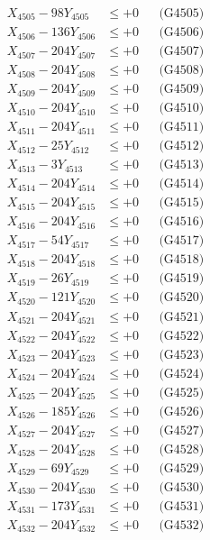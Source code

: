 \documentclass[a4paper,10pt]{article}
\begin{document}
{\begin{align}
X_{4505} - 98Y_{4505} &\leq +0 && \text{(G4505)} \\
X_{4506} - 136Y_{4506} &\leq +0 && \text{(G4506)} \\
X_{4507} - 204Y_{4507} &\leq +0 && \text{(G4507)} \\
X_{4508} - 204Y_{4508} &\leq +0 && \text{(G4508)} \\
X_{4509} - 204Y_{4509} &\leq +0 && \text{(G4509)} \\
X_{4510} - 204Y_{4510} &\leq +0 && \text{(G4510)} \\
\allowbreak
X_{4511} - 204Y_{4511} &\leq +0 && \text{(G4511)} \\
X_{4512} - 25Y_{4512} &\leq +0 && \text{(G4512)} \\
X_{4513} - 3Y_{4513} &\leq +0 && \text{(G4513)} \\
X_{4514} - 204Y_{4514} &\leq +0 && \text{(G4514)} \\
X_{4515} - 204Y_{4515} &\leq +0 && \text{(G4515)} \\
X_{4516} - 204Y_{4516} &\leq +0 && \text{(G4516)} \\
X_{4517} - 54Y_{4517} &\leq +0 && \text{(G4517)} \\
X_{4518} - 204Y_{4518} &\leq +0 && \text{(G4518)} \\
X_{4519} - 26Y_{4519} &\leq +0 && \text{(G4519)} \\
X_{4520} - 121Y_{4520} &\leq +0 && \text{(G4520)} \\
\allowbreak
X_{4521} - 204Y_{4521} &\leq +0 && \text{(G4521)} \\
X_{4522} - 204Y_{4522} &\leq +0 && \text{(G4522)} \\
X_{4523} - 204Y_{4523} &\leq +0 && \text{(G4523)} \\
X_{4524} - 204Y_{4524} &\leq +0 && \text{(G4524)} \\
X_{4525} - 204Y_{4525} &\leq +0 && \text{(G4525)} \\
X_{4526} - 185Y_{4526} &\leq +0 && \text{(G4526)} \\
X_{4527} - 204Y_{4527} &\leq +0 && \text{(G4527)} \\
X_{4528} - 204Y_{4528} &\leq +0 && \text{(G4528)} \\
X_{4529} - 69Y_{4529} &\leq +0 && \text{(G4529)} \\
X_{4530} - 204Y_{4530} &\leq +0 && \text{(G4530)} \\
\allowbreak
X_{4531} - 173Y_{4531} &\leq +0 && \text{(G4531)} \\
X_{4532} - 204Y_{4532} &\leq +0 && \text{(G4532)} \\

\end{align}}
\end{document}
